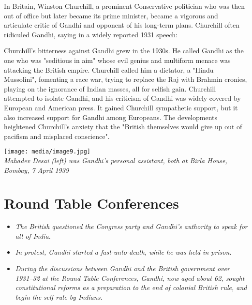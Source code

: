 In Britain, Winston Churchill, a prominent Conservative politician who
was then out of office but later became its prime minister, became a
vigorous and articulate critic of Gandhi and opponent of his long-term
plans. Churchill often ridiculed Gandhi, saying in a widely reported
1931 speech:

Churchill's bitterness against Gandhi grew in the 1930s. He called
Gandhi as the one who was "seditious in aim" whose evil genius and
multiform menace was attacking the British empire. Churchill called him
a dictator, a "Hindu Mussolini", fomenting a race war, trying to replace
the Raj with Brahmin cronies, playing on the ignorance of Indian masses,
all for selfish gain. Churchill attempted to isolate Gandhi, and his
criticism of Gandhi was widely covered by European and American press.
It gained Churchill sympathetic support, but it also increased support
for Gandhi among Europeans. The developments heightened Churchill's
anxiety that the "British themselves would give up out of pacifism and
misplaced conscience".

\texttt{[image: media/image9.jpg]}\\
\emph{Mahadev Desai (left) was Gandhi's personal assistant, both at
Birla House, Bombay, 7 April 1939}

\section{Round Table Conferences}\label{round-table-conferences}

\begin{itemize}
\item
  \emph{The British questioned the Congress party and Gandhi's authority
  to speak for all of India.}
\item
  \emph{In protest, Gandhi started a fast-unto-death, while he was held
  in prison.}
\item
  \emph{During the discussions between Gandhi and the British government
  over 1931--32 at the Round Table Conferences, Gandhi, now aged about
  62, sought constitutional reforms as a preparation to the end of
  colonial British rule, and begin the self-rule by Indians.}
\end{itemize}

